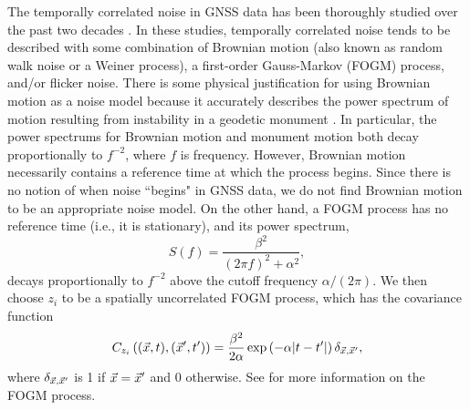 \documentclass[extra,mreferee]{gji}
\begin{document}

The temporally correlated noise in GNSS data has been thoroughly
studied over the past two decades \citep[e.g.,][]{Zhang1997, Mao1999,
Williams2004, Langbein2008}. In these studies, temporally correlated
noise tends to be described with some combination of Brownian motion
(also known as random walk noise or a Weiner process), a first-order
Gauss-Markov (FOGM) process, and/or flicker noise. There is some
physical justification for using Brownian motion as a noise model
because it accurately describes the power spectrum of motion resulting
from instability in a geodetic monument \citep[e.g.,][]{Wyatt1982,
Wyatt1989}. In particular, the power spectrums for Brownian motion and
monument motion both decay proportionally to $f^{-2}$, where $f$ is
frequency. However, Brownian motion necessarily contains a reference
time at which the process begins. Since there is no notion of when
noise ``begins" in GNSS data, we do not find Brownian motion to be an
appropriate noise model. On the other hand, a FOGM process has no
reference time (i.e., it is stationary), and its power spectrum,
\begin{equation}\label{eq:FOGMPS}
S(f) = \frac{\beta^2}{(2 \pi f)^2 + \alpha^2},
\end{equation}
decays proportionally to $f^{-2}$ above the cutoff frequency $\alpha /
(2 \pi)$. We then choose $z_i$ to be a spatially
uncorrelated FOGM process, which has the covariance function
\begin{equation}\label{eq:FOGM}
C_{z_i}\left((\vec{x},t),(\vec{x}',t')\right) = 
\frac{\beta^2}{2\alpha}
\exp\left(-\alpha|t - t'|\right)\delta_{\vec{x},\vec{x}'},
\end{equation}
where $\delta_{\vec{x},\vec{x}'}$ is 1 if $\vec{x} = \vec{x}'$ and 0 otherwise.
See \citet[sec. B2]{Rasmussen2006} for more information on the FOGM
process.

\end{document}
